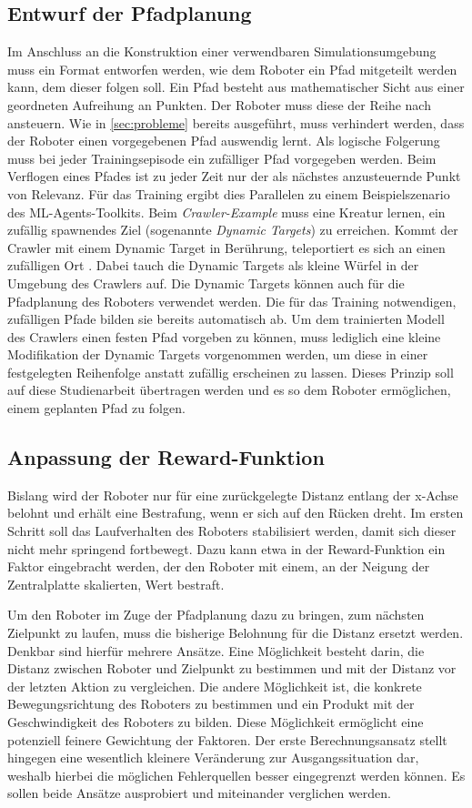 \subsection{Entwurf der Pfadplanung}
Im Anschluss an die Konstruktion einer verwendbaren Simulationsumgebung muss ein Format entworfen werden, wie dem Roboter ein Pfad mitgeteilt werden kann, dem dieser folgen soll.
Ein Pfad besteht aus mathematischer Sicht aus einer geordneten Aufreihung an Punkten.
Der Roboter muss diese der Reihe nach ansteuern.
Wie in \autoref{sec:probleme} bereits ausgeführt, muss verhindert werden, dass der Roboter einen vorgegebenen Pfad auswendig lernt.
Als logische Folgerung muss bei jeder Trainingsepisode ein zufälliger Pfad vorgegeben werden.
Beim Verflogen eines Pfades ist zu jeder Zeit nur der als nächstes anzusteuernde Punkt von Relevanz.
Für das Training ergibt dies Parallelen zu einem Beispielszenario des ML-Agents-Toolkits.
Beim \emph{Crawler-Example} muss eine Kreatur lernen, ein zufällig spawnendes Ziel (sogenannte \emph{Dynamic Targets}) zu erreichen.
Kommt der Crawler mit einem Dynamic Target in Berührung, teleportiert es sich an einen zufälligen Ort \cite{crawlerExample}.
Dabei tauch die Dynamic Targets als kleine Würfel in der Umgebung des Crawlers auf.
Die Dynamic Targets können auch für die Pfadplanung des Roboters verwendet werden.
Die für das Training notwendigen, zufälligen Pfade bilden sie bereits automatisch ab.
Um dem trainierten Modell des Crawlers einen festen Pfad vorgeben zu können, muss lediglich eine kleine Modifikation der Dynamic Targets vorgenommen werden, um diese in einer festgelegten Reihenfolge anstatt zufällig erscheinen zu lassen.
Dieses Prinzip soll auf diese Studienarbeit übertragen werden und es so dem Roboter ermöglichen, einem geplanten Pfad zu folgen.

\subsection{Anpassung der Reward-Funktion}
Bislang wird der Roboter nur für eine zurückgelegte Distanz entlang der x-Achse belohnt und erhält eine Bestrafung, wenn er sich auf den Rücken dreht.
Im ersten Schritt soll das Laufverhalten des Roboters stabilisiert werden, damit sich dieser nicht mehr springend fortbewegt.
Dazu kann etwa in der Reward-Funktion ein Faktor eingebracht werden, der den Roboter mit einem, an der Neigung der Zentralplatte skalierten, Wert bestraft.

Um den Roboter im Zuge der Pfadplanung dazu zu bringen, zum nächsten Zielpunkt zu laufen, muss die bisherige Belohnung für die Distanz ersetzt werden.
Denkbar sind hierfür mehrere Ansätze.
Eine Möglichkeit besteht darin, die Distanz zwischen Roboter und Zielpunkt zu bestimmen und mit der Distanz vor der letzten Aktion zu vergleichen.
Die andere Möglichkeit ist, die konkrete Bewegungsrichtung des Roboters zu bestimmen und ein Produkt mit der Geschwindigkeit des Roboters zu bilden.
Diese Möglichkeit ermöglicht eine potenziell feinere Gewichtung der Faktoren.
Der erste Berechnungsansatz stellt hingegen eine wesentlich kleinere Veränderung zur Ausgangssituation dar, weshalb hierbei die möglichen Fehlerquellen besser eingegrenzt werden können.
Es sollen beide Ansätze ausprobiert und miteinander verglichen werden.

